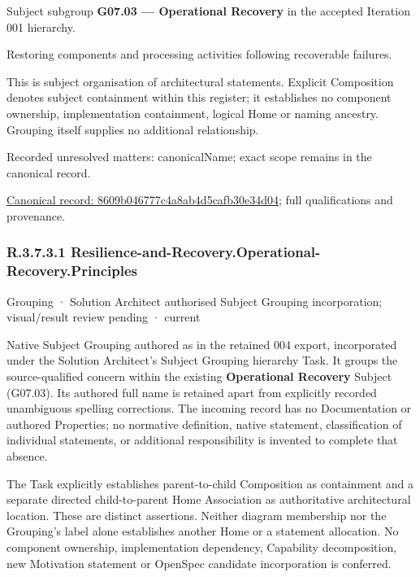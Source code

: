 Subject subgroup \textbf{G07.03 — Operational Recovery} in the accepted Iteration 001 hierarchy.



Restoring components and processing activities following recoverable failures.



This is subject organisation of architectural statements. Explicit Composition denotes subject containment within this register; it establishes no component ownership, implementation containment, logical Home or naming ancestry. Grouping itself supplies no additional relationship.


{\small Recorded unresolved matters: canonicalName; exact scope remains in the canonical record.}\par
{\footnotesize \href{../../../../continuum/grouping/8609b046777c4a8ab4d5cafb30e34d04.md}{Canonical record: 8609b046777c4a8ab4d5cafb30e34d04}; full qualifications and provenance.}\par
\subsubsection*{R.3.7.3.1 Resilience-and-Recovery.Operational-Recovery.Principles}
\label{navigation:R.3.7.3.1}

\label{element:901d49996c9545bb99cb0e0e7c043c81}
{\small Grouping · Solution Architect authorised Subject Grouping incorporation; visual/result review pending · current}\par

Native Subject Grouping authored as \texttt{} in the retained 004 export,
incorporated under the Solution Architect's Subject Grouping hierarchy Task.
It groups the source-qualified \texttt{} concern within
the existing \textbf{Operational Recovery} Subject (G07.03). Its authored full name
is retained apart from explicitly recorded unambiguous spelling corrections.
The incoming record has no Documentation or authored Properties; no normative
definition, native statement, classification of individual statements, or
additional responsibility is invented to complete that absence.



The Task explicitly establishes parent-to-child Composition as containment and
a separate directed child-to-parent Home Association as authoritative architectural
location. These are distinct assertions. Neither diagram membership nor the
Grouping's label alone establishes another Home or a statement allocation.
No component ownership, implementation dependency, Capability decomposition,
new Motivation statement or OpenSpec candidate incorporation is conferred.



